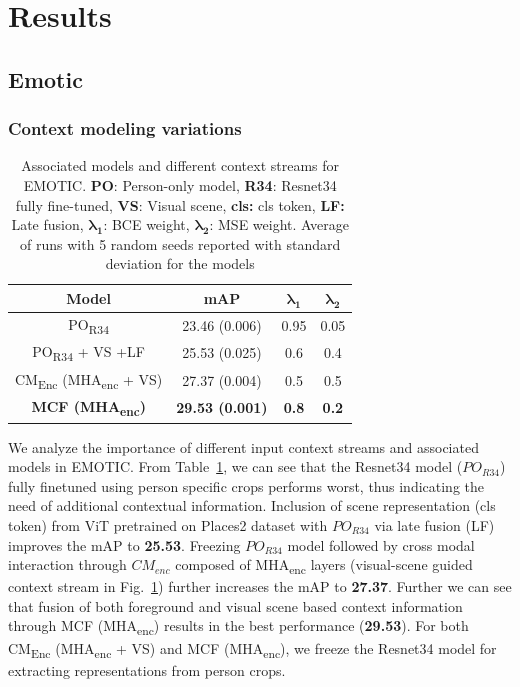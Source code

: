 \section{Results}
\subsection{Emotic}
\subsubsection{Context modeling variations}
\begin{table}[h!]
\centering
\begin{tabular}{|c|c|c|c|}
\hline
\textbf{Model}                      & \textbf{mAP}            & $\mathbf{\lambda_{1}}$ & $\mathbf{\lambda_{2}}$ \\ \hline
PO\textsubscript{R34}                  & 23.46 (0.006)           & 0.95                   & 0.05               \\ \hline
PO\textsubscript{R34} + VS +LF & 25.53 (0.025)           & 0.6                    & 0.4                \\ \hline
CM\textsubscript{Enc} (MHA\textsubscript{enc} + VS)        & 27.37 (0.004)           & 0.5                    & 0.5                \\ \hline
\textbf{MCF (MHA\textsubscript{enc})}               & \textbf{29.53 (0.001)} & \textbf{0.8}           & \textbf{0.2}       \\ \hline
\end{tabular}
\caption{Associated models and different context streams for EMOTIC. \textbf{PO}: Person-only model, \textbf{R34}: Resnet34 fully fine-tuned, \textbf{VS}: Visual scene, \textbf{cls:} cls token, \textbf{LF:} Late fusion, $\mathbf{\lambda_{1}}$: BCE weight, $\mathbf{\lambda_{2}}$: MSE weight. Average of runs with 5 random seeds reported with standard deviation for the models}
\label{ablationemotic}
\end{table}
We analyze the importance of different input context streams and associated models in EMOTIC. From Table~\ref{ablationemotic}, we can see that the Resnet34 model ($PO_{R34}$) fully finetuned using person specific crops performs worst, thus indicating the need of additional contextual information. Inclusion of scene representation (cls token) from ViT pretrained on Places2 dataset with $PO_{R34}$ via late fusion (LF) improves the mAP to \textbf{25.53}. Freezing $PO_{R34}$ model followed by cross modal interaction through $CM_{enc}$ composed of MHA\textsubscript{enc} layers (visual-scene guided context stream in Fig.~\ref{ablationemotic}) further increases the mAP to \textbf{27.37}. Further we can see that fusion of both foreground and visual scene based context information through MCF (MHA\textsubscript{enc}) results in the best performance (\textbf{29.53}). For both CM\textsubscript{Enc} (MHA\textsubscript{enc} + VS) and MCF (MHA\textsubscript{enc}), we freeze the Resnet34 model for extracting representations from person crops. 

